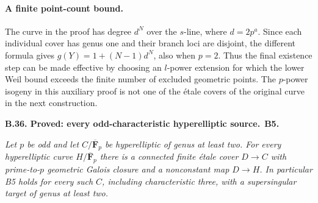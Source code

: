 \documentclass[11pt,a4paper]{article}
\newcommand{\F}{\mathbf F}
\newenvironment{claim}[3]{\par\medskip\noindent\hypertarget{#1}{\textbf{#1. #2.}}\ \textbf{#3.}\par\nopagebreak\smallskip\begingroup\itshape}{\endgroup\par\smallskip}
\begin{document}
\paragraph{A finite point-count bound.}
The curve in the proof has degree $d^N$ over the $s$-line, where
$d=2p^a$. Since each individual cover has genus one and their branch
loci are disjoint, the different formula gives
$g(Y)=1+(N-1)d^N$, also when $p=2$. Thus the final existence step
can be made effective by choosing an $l$-power extension for which
the lower Weil bound exceeds the finite number of excluded geometric
points. The $p$-power isogeny in this auxiliary proof is not one of
the \'etale covers of the original curve in the next construction.

\begin{claim}{B.36}{Proved: every odd-characteristic hyperelliptic source}{B5}
Let $p$ be odd and let $C/\overline{\F}_p$ be hyperelliptic of genus
at least two. For every hyperelliptic curve $H/\overline{\F}_p$ there
is a connected finite \'etale cover $D\to C$ with prime-to-$p$
geometric Galois closure and a nonconstant map $D\to H$.
In particular B5 holds for every such $C$, including characteristic
three, with a supersingular target of genus at least two.
\end{claim}
\end{document}
